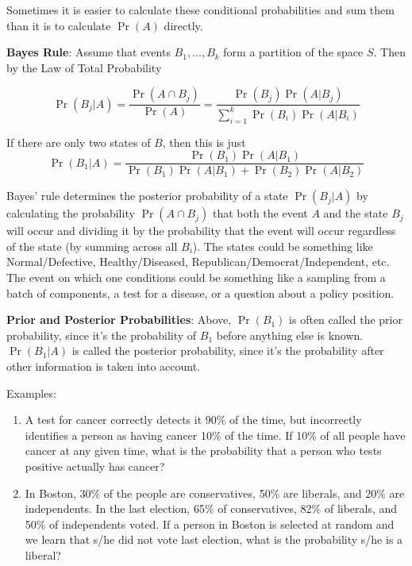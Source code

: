 \documentclass[]{book}
\theoremstyle{definition}
\theoremstyle{definition}
\theoremstyle{definition}
\theoremstyle{remark}
\begin{document}
Sometimes it is easier to calculate these conditional probabilities and
sum them than it is to calculate \(\Pr(A)\) directly.

\textbf{Bayes Rule}: Assume that events \(B_1,\ldots,B_k\) form a
partition of the space \(S\). Then by the Law of Total Probability

\[\Pr(B_j|A)= \frac{\Pr(A \cap B_j)} {\Pr(A)} = \frac{\Pr(B_j) \Pr(A|B_j)}{\sum\limits_{i=1}^k \Pr(B_i)\Pr(A|B_i)}\]

If there are only two states of \(B\), then this is just
\[\Pr(B_1|A)=\frac{\Pr(B_1)\Pr(A|B_1)} {\Pr(B_1)\Pr(A|B_1)+\Pr(B_2)\Pr(A|B_2)}\]

Bayes' rule determines the posterior probability of a state
\(\Pr(B_j|A)\) by calculating the probability \(\Pr(A \cap B_j)\) that
both the event \(A\) and the state \(B_j\) will occur and dividing it by
the probability that the event will occur regardless of the state (by
summing across all \(B_i\)). The states could be something like
Normal/Defective, Healthy/Diseased, Republican/Democrat/Independent,
etc. The event on which one conditions could be something like a
sampling from a batch of components, a test for a disease, or a question
about a policy position.

\textbf{Prior and Posterior Probabilities}: Above, \(\Pr(B_1)\) is often
called the prior probability, since it's the probability of \(B_1\)
before anything else is known. \(\Pr(B_1|A)\) is called the posterior
probability, since it's the probability after other information is taken
into account.

\begin{framed}
Examples:

\begin{enumerate}
\item A test for cancer correctly detects it 90\%  of the time, but incorrectly identifies a person as having cancer 10\% of the time.  If 10\% of all people have cancer at any given time, what is the probability that a person who tests positive actually has cancer?\\[6pt]
\item In Boston, 30\% of the people are conservatives, 50\% are liberals, and 20\% are independents.  In the last election, 65\% of conservatives, 82\% of liberals, and 50\% of independents voted.  If a person in Boston is selected at random and we learn that s/he did not vote last election, what is the probability s/he is a liberal?\\[6pt]
\end{enumerate}
\end{framed}
\end{document}
